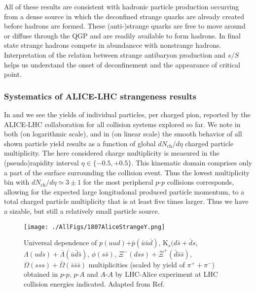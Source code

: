 All of these results are consistent with hadronic particle production occurring from a dense source in which the deconfined strange quarks are already created before hadrons are formed. These (anti-)strange quarks are free to move around or diffuse through the QGP and are readily available to form hadrons. In final state strange hadrons compete in abundancce with nonstrange hadrons. Interpretation of the relation between strange antibaryon production and $s/S$ helps us understand the onset of deconfinement and the appearance of critical point.
 



\subsubsection{Systematics of ALICE-LHC strangeness results}\label{sec:AliceSys}

In  and  we see the yields of individual particles, per charged pion, reported by the ALICE-LHC collaboration for all collision systems explored so far. We note in both  (on logarithmic scale), and in  (on linear scale) the smooth behavior of all shown particle yield results as a function of global $dN_\mathrm{ch}/d\eta$ charged particle multiplicity. The here considered charge multiplicity is measured in the (pseudo)rapidity interval $\eta\in\{-0.5,+0.5\}$. This kinematic domain comprises only a part of the surface surrounding the collision event. Thus the lowest multiplicity bin with $dN_\mathrm{ch}/d\eta\simeq 3\pm 1$ for the most peripheral $p$-$p$ collisions corresponds, allowing for the expected large longitudonal produced particle momentum, to a total charged particle multiplicity that is at least five times larger. Thus we have a sizable, but still a relatively small particle source.

\begin{figure}[tb]\sidecaption
\centerline{%
\texttt{[image: ./AllFigs/1807AliceStrangeY.png]} 
}
\caption{%
Universal dependence of $p(uud)$+$\bar p(\bar u\bar u\bar d)$, K$_s(d\bar s+\bar d s$, $\Lambda(uds)+\overline{\Lambda}(\bar u\bar d\bar s)$, $\phi(s\bar s)$, $\Xi^-(dss)+\overline{\Xi}^+(\bar d\bar s\bar s)$, $\Omega(sss)+\overline{\Omega}(\bar s\bar s\bar s)$ multiplicities (scaled by yield of $\pi^+ + \pi^-$) obtained in $p$-$p$, $p$-$A$ and $A$-$A$ by LHC-Alice experiment at LHC collision energies indicated. Adapted from Ref.\cite{Albuquerque:2018kyy}
}
\label{fig:hypppp}
\end{figure}
 
